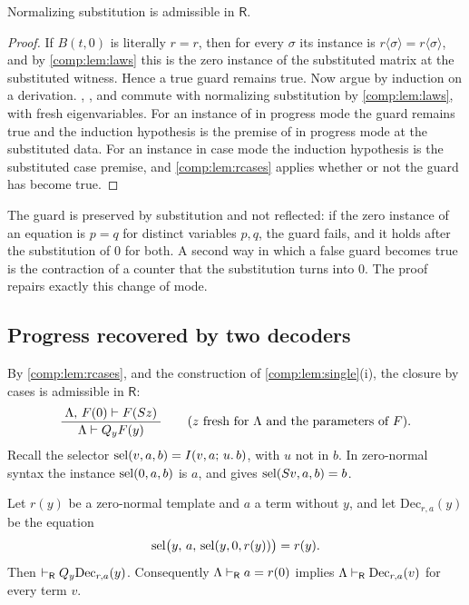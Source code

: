 \begin{lemma}[Substitution]
\label{comp:lem:rsubst}
Normalizing substitution is admissible in $\mathsf{R}$.
\end{lemma}

\begin{proof}
If $B(t,0)$ is literally $r=r$, then for every $\sigma$ its instance is
$r\langle\sigma\rangle=r\langle\sigma\rangle$, and by \cref{comp:lem:laws}
this is the zero instance of the substituted matrix at the substituted
witness. Hence a true guard remains true. Now argue by induction on a
derivation. , ,  and 
commute with normalizing substitution by \cref{comp:lem:laws}, with fresh
eigenvariables. For an instance of  in progress mode the guard
remains true and the induction hypothesis is the premise of  in
progress mode at the substituted data. For an instance in case mode the
induction hypothesis is the substituted case premise, and
\cref{comp:lem:rcases} applies whether or not the guard has become true.
\end{proof}

The guard is preserved by substitution and not reflected: if the zero
instance of an equation is $p=q$ for distinct variables $p,q$, the guard
fails, and it holds after the substitution of $0$ for both. A second way in
which a false guard becomes true is the contraction of a counter that the
substitution turns into $0$. The proof repairs exactly this change of mode.

\subsection{Progress recovered by two decoders}

By \cref{comp:lem:rcases},  and the construction of
\cref{comp:lem:single}(i), the closure by cases is admissible in
$\mathsf{R}$:
\begin{equation}
\label{comp:eq:rqcase}
 \dfrac{\;\Lambda,\,F(0)\vdash F(S z)\;}{\;\Lambda\vdash Q_{y}F(y)\;}
 \qquad(z\text{ fresh for }\Lambda\text{ and the parameters of }F).
\end{equation}
Recall the selector $\operatorname{sel}(v,a,b)=I(v,a;\,u.\,b)$, with $u$ not in $b$. In
zero-normal syntax the instance $\operatorname{sel}(0,a,b)$ is $a$, and 
gives $\operatorname{sel}(S v,a,b)=b$.

\begin{lemma}
\label{comp:lem:decoder}
Let $r(y)$ be a zero-normal template and $a$ a term without $y$, and let
$\mathrm{Dec}_{r,a}(y)$ be the equation
\[
 \operatorname{sel}\bigl(y,\,a,\,\operatorname{sel}(y,0,r(y))\bigr)=r(y).
\]
Then $\vdash_{\mathsf R}Q_{y}\mathrm{Dec}_{r,a}(y)$. Consequently
$\Lambda\vdash_{\mathsf R}a=r(0)$ implies
$\Lambda\vdash_{\mathsf R}\mathrm{Dec}_{r,a}(v)$ for every term $v$.
\end{lemma}

